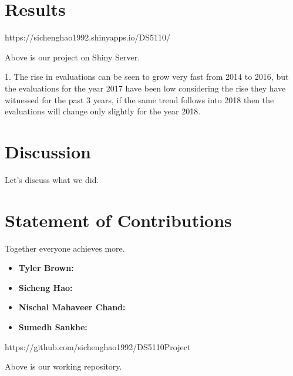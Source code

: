 \documentclass[12pt]{article}
\begin{document}
\section*{Results}

https://sichenghao1992.shinyapps.io/DS5110/

Above is our project on Shiny Server. 


1. The rise in evaluations can be seen to grow very fast from 2014 to 2016, but the 
evaluations for the year 2017 have been low considering the rise they have witnessed 
for the past 3 years, if the same trend follows into 2018 then the evaluations will change 
only slightly for the year 2018.

\section*{Discussion}

Let's discuss what we did.

\section*{Statement of Contributions}

Together everyone achieves more.

\begin{itemize}
\item \textbf{Tyler Brown:}
\item \textbf{Sicheng Hao:}
\item \textbf{Nischal Mahaveer Chand:}
\item \textbf{Sumedh Sankhe:}
\end{itemize}

 


\begin{appendices}

https://github.com/sichenghao1992/DS5110Project

Above is our working repository.

\end{appendices}
\end{document}

